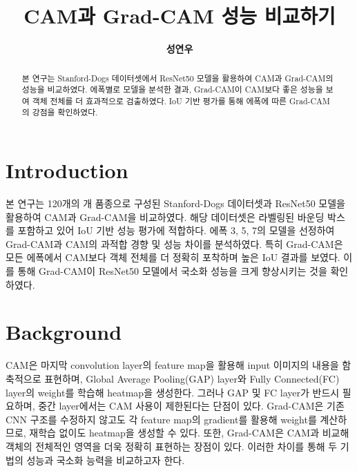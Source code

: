 \documentclass[twocolumn]{article}
\title{\textbf{CAM과 Grad-CAM 성능 비교하기}}
\author{\textbf{성연우}}
\begin{document}
\maketitle

\begin{abstract}
본 연구는 Stanford-Dogs 데이터셋에서 ResNet50 모델을 활용하여 CAM과 Grad-CAM의 성능을 비교하였다.
에폭별로 모델을 분석한 결과, Grad-CAM이 CAM보다 좋은 성능을 보여 객체 전체를 더 효과적으로 검출하였다.
IoU 기반 평가를 통해 에폭에 따른 Grad-CAM의 강점을 확인하였다.
\end{abstract}

\section{Introduction}
본 연구는 120개의 개 품종으로 구성된 Stanford-Dogs 데이터셋과 ResNet50 모델을 활용하여 CAM과 Grad-CAM을 비교하였다.
해당 데이터셋은 라벨링된 바운딩 박스를 포함하고 있어 IoU 기반 성능 평가에 적합하다.
에폭 3, 5, 7의 모델을 선정하여 Grad-CAM과 CAM의 과적합 경향 및 성능 차이를 분석하였다.
특히 Grad-CAM은 모든 에폭에서 CAM보다 객체 전체를 더 정확히 포착하며 높은 IoU 결과를 보였다.
이를 통해 Grad-CAM이 ResNet50 모델에서 국소화 성능을 크게 향상시키는 것을 확인하였다.

\section{Background}
CAM은 마지막 convolution layer의 feature map을 활용해 input 이미지의 내용을 함축적으로 표현하며, Global Average Pooling(GAP) layer와 Fully Connected(FC) layer의 weight를 학습해 heatmap을 생성한다.
그러나 GAP 및 FC layer가 반드시 필요하며, 중간 layer에서는 CAM 사용이 제한된다는 단점이 있다.
Grad-CAM은 기존 CNN 구조를 수정하지 않고도 각 feature map의 gradient를 활용해 weight를 계산하므로, 재학습 없이도 heatmap을 생성할 수 있다.
또한, Grad-CAM은 CAM과 비교해 객체의 전체적인 영역을 더욱 정확히 표현하는 장점이 있다.
이러한 차이를 통해 두 기법의 성능과 국소화 능력을 비교하고자 한다.
\end{document}
